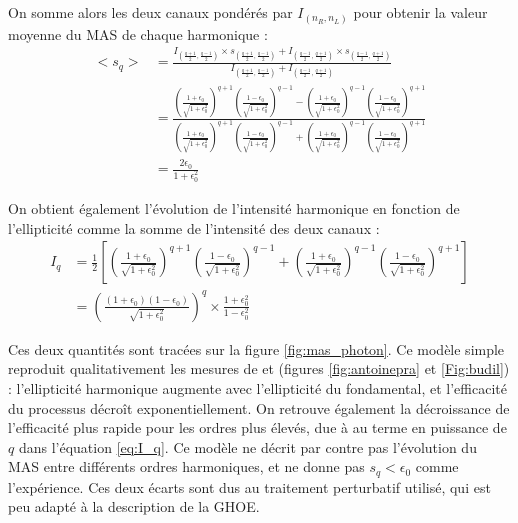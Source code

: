 On somme alors les deux canaux pondérés par $I_{(n_R,n_L)}$ pour obtenir la valeur moyenne du MAS de chaque harmonique :
\begin{align}
<s_q> &= \frac{I_{(\frac{q+1}{2},\frac{q-1}{2})}\times s_{(\frac{q+1}{2},\frac{q-1}{2})}+I_{(\frac{q-1}{2},\frac{q+1}{2})} \times s_{(\frac{q-1}{2},\frac{q+1}{2})}}{I_{(\frac{q+1}{2},\frac{q-1}{2})}+I_{(\frac{q-1}{2},\frac{q+1}{2})}}\nonumber\\
&= \frac{\left(\frac{1+\epsilon_0}{\sqrt{1+\epsilon_0^2}}\right)^{q+1}\left(\frac{1-\epsilon_0}{\sqrt{1+\epsilon_0^2}}\right)^{q-1}
-
\left(\frac{1+\epsilon_0}{\sqrt{1+\epsilon_0^2}}\right)^{q-1}\left(\frac{1-\epsilon_0}{\sqrt{1+\epsilon_0^2}}\right)^{q+1}
}{
\left(\frac{1+\epsilon_0}{\sqrt{1+\epsilon_0^2}}\right)^{q+1}\left(\frac{1-\epsilon_0}{\sqrt{1+\epsilon_0^2}}\right)^{q-1}
+
\left(\frac{1+\epsilon_0}{\sqrt{1+\epsilon_0^2}}\right)^{q-1}\left(\frac{1-\epsilon_0}{\sqrt{1+\epsilon_0^2}}\right)^{q+1}
}\nonumber\\
&= \frac{2\epsilon_0}{1+\epsilon_0^2}
\label{eq:mas_q}
\end{align}

On obtient également l'évolution de l'intensité harmonique en fonction de l'ellipticité comme la somme de l'intensité des deux canaux :
\begin{align}
I_q &= \frac{1}{2}\left[\left(\frac{1+\epsilon_0}{\sqrt{1+\epsilon_0^2}}\right)^{q+1}\left(\frac{1-\epsilon_0}{\sqrt{1+\epsilon_0^2}}\right)^{q-1}+\left(\frac{1+\epsilon_0}{\sqrt{1+\epsilon_0^2}}\right)^{q-1}\left(\frac{1-\epsilon_0}{\sqrt{1+\epsilon_0^2}}\right)^{q+1}\right]\nonumber\\
&= \left(\frac{(1+\epsilon_0)(1-\epsilon_0)}{\sqrt{1+\epsilon_0^2}}\right)^{q}\times\frac{1+\epsilon_0^2}{1-\epsilon_0^2}
\label{eq:I_q}
\end{align}

Ces deux quantités sont tracées sur la figure \ref{fig:mas_photon}. Ce modèle simple reproduit qualitativement les mesures de  et  (figures \ref{fig:antoinepra} et \ref{Fig:budil}) : l'ellipticité harmonique augmente avec l'ellipticité du fondamental, et l'efficacité du processus décroît exponentiellement. On retrouve également la décroissance de l'efficacité plus rapide pour les ordres plus élevés, due à au terme en puissance de $q$ dans l'équation \ref{eq:I_q}. Ce modèle ne décrit par contre pas l'évolution du MAS entre différents ordres harmoniques, et ne donne pas $s_q<\epsilon_0$ comme l'expérience. Ces deux écarts sont dus au traitement perturbatif utilisé, qui est peu adapté à la description de la GHOE.

